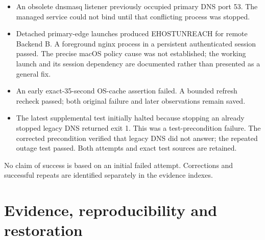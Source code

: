\documentclass[12pt,a4paper]{article}
\begin{document}
\begin{itemize}
\item An obsolete dnsmasq listener previously occupied primary DNS port 53. The managed service could not bind until that conflicting process was stopped.
\item Detached primary-edge launches produced EHOSTUNREACH for remote Backend B. A foreground nginx process in a persistent authenticated session passed. The precise macOS policy cause was not established; the working launch and its session dependency are documented rather than presented as a general fix.
\item An early exact-35-second OS-cache assertion failed. A bounded refresh recheck passed; both original failure and later observations remain saved.
\item The latest supplemental test initially halted because stopping an already stopped legacy DNS returned exit 1. This was a test-precondition failure. The corrected precondition verified that legacy DNS did not answer; the repeated outage test passed. Both attempts and exact test sources are retained.
\end{itemize}


No claim of success is based on an initial failed attempt. Corrections and successful repeats are identified separately in the evidence indexes.


\section{Evidence, reproducibility and restoration}
\end{document}
